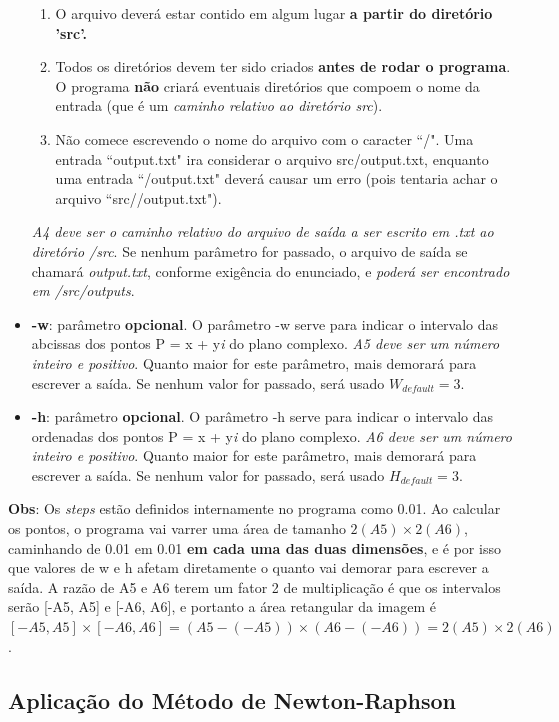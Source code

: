 \documentclass[11pt]{article}
\begin{document}
\begin{itemize}
    \begin{enumerate}
      \item O arquivo deverá estar contido em algum lugar \textbf{a partir do diretório 'src'.}
      \item Todos os diretórios devem ter sido criados \textbf{antes de rodar o programa}. O programa \textbf{não} criará eventuais diretórios que compoem o nome da entrada (que é um \textit{caminho relativo ao diretório src}).
      \item Não comece escrevendo o nome do arquivo com o caracter ``/". Uma entrada ``output.txt" ira considerar o arquivo src/output.txt, enquanto uma entrada ``/output.txt" deverá causar um erro (pois tentaria achar o
      arquivo ``src//output.txt").
    \end{enumerate}
    \textit{A4 deve ser o caminho relativo do arquivo de saída a ser escrito em .txt ao diretório /src}. Se nenhum parâmetro for passado, o arquivo de saída se chamará \textit{output.txt}, conforme exigência do enunciado, e \textit{
    poderá ser encontrado em /src/outputs}.
  \item \textbf{-w}: parâmetro \textbf{opcional}. O parâmetro -w serve para indicar o intervalo das abcissas dos pontos P = x + y\textit{i} do plano complexo. \textit{A5 deve ser um número inteiro e positivo}. Quanto maior for este parâmetro, mais
  demorará para escrever a saída. Se nenhum valor for passado, será usado $W_{default} = 3$.
  \item \textbf{-h}: parâmetro \textbf{opcional}. O parâmetro -h serve para indicar o intervalo das ordenadas dos pontos P = x + y\textit{i} do plano complexo. \textit{A6 deve ser um número inteiro e positivo}. Quanto maior for este parâmetro, mais
  demorará para escrever a saída. Se nenhum valor for passado, será usado $H_{default} = 3$.
\end{itemize}

\textbf{Obs}: Os \textit{steps} estão definidos internamente no programa como 0.01. Ao calcular os pontos, o programa vai varrer uma área de tamanho $2(A5) \times 2(A6)$, caminhando de 0.01 em 0.01 \textbf{em cada uma das duas dimensões}, e
é por isso que valores de w e h afetam diretamente o quanto vai demorar para escrever a saída. A razão de A5 e A6 terem um fator 2 de multiplicação é que os intervalos serão [-A5, A5] e [-A6, A6], e portanto a área retangular da imagem é
$[-A5, A5] \times [-A6, A6] = (A5 - (-A5)) \times (A6 - (-A6)) = 2(A5) \times 2(A6)$.

\subsection{Aplicação do Método de Newton-Raphson}
\end{document}
